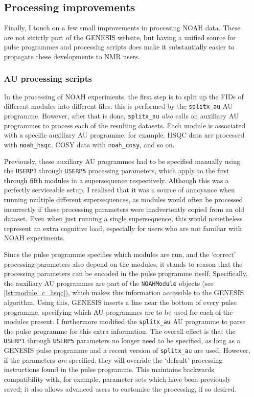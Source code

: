 \subsection{Processing improvements}
\label{subsec:noah__genesis_processing}

Finally, I touch on a few small improvements in processing NOAH data.
These are not strictly part of the GENESIS website, but having a unified source for pulse programmes and processing scripts does make it substantially easier to propagate these developments to NMR users.


\subsubsection{AU processing scripts}

In the processing of NOAH experiments, the first step is to split up the FIDs of different modules into different files: this is performed by the \texttt{splitx\_au} AU programme.
However, after that is done, \texttt{splitx\_au} \textit{also} calls on auxiliary AU programmes to process each of the resulting datasets.
Each module is associated with a specific auxiliary AU programme: for example, HSQC data are processed with \texttt{noah\_hsqc}, COSY data with \texttt{noah\_cosy}, and so on.

Previously, these auxiliary AU programmes had to be specified manually using the \texttt{USERP1} through \texttt{USERP5} processing parameters, which apply to the first through fifth modules in a supersequence respectively.
Although this was a perfectly serviceable setup, I realised that it was a source of annoyance when running multiple different supersequences, as modules would often be processed incorrectly if these processing parameters were inadvertently copied from an old dataset.
Even when just running a single supersequence, this would nonetheless represent an extra cognitive load, especially for users who are not familiar with NOAH experiments.

Since the pulse programme specifies which modules are run, and the `correct' processing parameters also depend on the modules, it stands to reason that the processing parameters can be encoded in the pulse programme itself.
Specifically, the auxiliary AU programmes are part of the \texttt{NOAHModule} objects (see \cref{lst:module_c_hsqc}), which makes this information accessible to the GENESIS algorithm.
Using this, GENESIS inserts a line near the bottom of every pulse programme, specifying which AU programmes are to be used for each of the modules present.
I furthermore modified the \texttt{splitx\_au} AU programme to parse the pulse programme for this extra information.
The overall effect is that the \texttt{USERP1} through \texttt{USERP5} parameters no longer need to be specified, as long as a GENESIS pulse programme and a recent version of \texttt{splitx\_au} are used.
However, if the parameters \textit{are} specified, they will override the `default' processing instructions found in the pulse programme.
This maintains backwards compatibility with, for example, parameter sets which have been previously saved; it also allows advanced users to customise the processing, if so desired.



